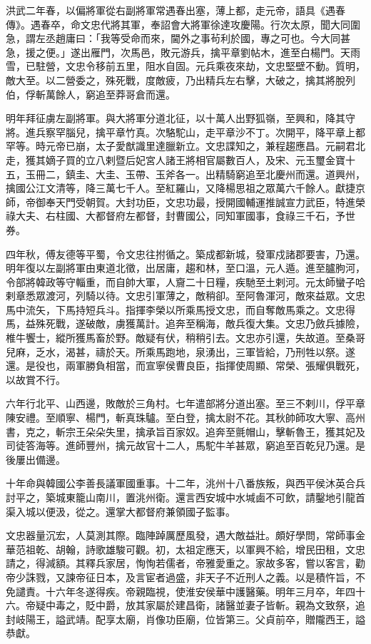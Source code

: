 \begin{pinyinscope}
洪武二年春，以偏將軍從右副將軍常遇春出塞，薄上都，走元帝，語具《遇春傳》。遇春卒，命文忠代將其軍，奉詔會大將軍徐達攻慶陽。行次太原，聞大同圍急，謂左丞趙庸曰：「我等受命而來，閫外之事茍利於國，專之可也。今大同甚急，援之便。」遂出雁門，次馬邑，敗元游兵，擒平章劉帖木，進至白楊門。天雨雪，已駐營，文忠令移前五里，阻水自固。元兵乘夜來劫，文忠堅壁不動。質明，敵大至。以二營委之，殊死戰，度敵疲，乃出精兵左右擊，大破之，擒其將脫列伯，俘斬萬餘人，窮追至莽哥倉而還。

明年拜征虜左副將軍。與大將軍分道北征，以十萬人出野狐嶺，至興和，降其守將。進兵察罕腦兒，擒平章竹真。次駱駝山，走平章沙不丁。次開平，降平章上都罕等。時元帝已崩，太子愛猷識里達臘新立。文忠諜知之，兼程趨應昌。元嗣君北走，獲其嫡子買的立八剌暨后妃宮人諸王將相官屬數百人，及宋、元玉璽金寶十五，玉冊二，鎮圭、大圭、玉帶、玉斧各一。出精騎窮追至北慶州而還。道興州，擒國公江文清等，降三萬七千人。至紅羅山，又降楊思祖之眾萬六千餘人。獻捷京師，帝御奉天門受朝賀。大封功臣，文忠功最，授開國輔運推誠宣力武臣，特進榮祿大夫、右柱國、大都督府左都督，封曹國公，同知軍國事，食祿三千石，予世券。

四年秋，傅友德等平蜀，令文忠往拊循之。築成都新城，發軍戍諸郡要害，乃還。明年復以左副將軍由東道北徵，出居庸，趨和林，至口溫，元人遁。進至臚朐河，令部將韓政等守輜重，而自帥大軍，人齎二十日糧，疾馳至土剌河。元太師蠻子哈剌章悉眾渡河，列騎以待。文忠引軍薄之，敵稍卻。至阿魯渾河，敵來益眾。文忠馬中流矢，下馬持短兵斗。指揮李榮以所乘馬授文忠，而自奪敵馬乘之。文忠得馬，益殊死戰，遂破敵，虜獲萬計。追奔至稱海，敵兵復大集。文忠乃斂兵據險，椎牛饗士，縱所獲馬畜於野。敵疑有伏，稍稍引去。文忠亦引還，失故道。至桑哥兒麻，乏水，渴甚，禱於天。所乘馬跑地，泉湧出，三軍皆給，乃刑牲以祭。遂還。是役也，兩軍勝負相當，而宣寧侯曹良臣，指揮使周顯、常榮、張耀俱戰死，以故賞不行。

六年行北平、山西邊，敗敵於三角村。七年遣部將分道出塞。至三不剌川，俘平章陳安禮。至順寧、楊門，斬真珠驢。至白登，擒太尉不花。其秋帥師攻大寧、高州書，克之，斬宗王朵朵失里，擒承旨百家奴。追奔至氈帽山，擊斬魯王，獲其妃及司徒答海等。進師豐州，擒元故官十二人，馬駝牛羊甚眾，窮追至百乾兒乃還。是後屢出備邊。

十年命與韓國公李善長議軍國重事。十二年，洮州十八番族叛，與西平侯沐英合兵討平之，築城東籠山南川，置洮州衛。還言西安城中水堿鹵不可飲，請鑿地引龍首渠入城以便汲，從之。還掌大都督府兼領國子監事。

文忠器量沉宏，人莫測其際。臨陣踔厲歷風發，遇大敵益壯。頗好學問，常師事金華范祖乾、胡翰，詩歌雄駿可觀。初，太祖定應天，以軍興不給，增民田租，文忠請之，得減額。其釋兵家居，恂恂若儒者，帝雅愛重之。家故多客，嘗以客言，勸帝少誅戮，又諫帝征日本，及言宦者過盛，非天子不近刑人之義。以是積忤旨，不免譴責。十六年冬遂得疾。帝親臨視，使淮安侯華中護醫藥。明年三月卒，年四十六。帝疑中毒之，貶中爵，放其家屬於建昌衛，諸醫並妻子皆斬。親為文致祭，追封岐陽王，謚武靖。配享太廟，肖像功臣廟，位皆第三。父貞前卒，贈隴西王，謚恭獻。


\end{pinyinscope}
